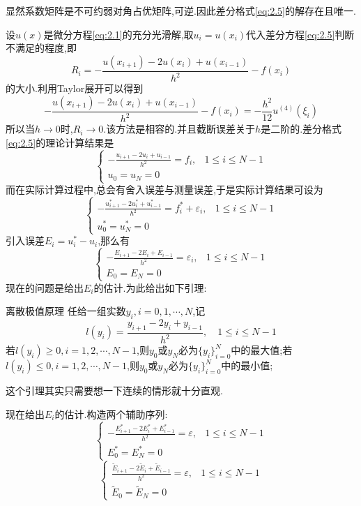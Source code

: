 显然系数矩阵是不可约弱对角占优矩阵,可逆.因此差分格式\eqref{eq:2.5}的解存在且唯一.\par
设$u(x)$是微分方程\eqref{eq:2.1}的充分光滑解,取$u_i=u(x_i)$代入差分方程\eqref{eq:2.5}判断不满足的程度,即
$$
R_i=-\frac{u(x_{i+1})-2u(x_i)+u(x_{i-1})}{h^2}-f(x_i)
$$
的大小.利用Taylor展开可以得到
$$
-\frac{u(x_{i+1})-2u(x_i)+u(x_{i-1})}{h^2}-f(x_i)=-\frac{h^2}{12}u^{(4)}(\xi_i)
$$
所以当$h\to 0$时,$R_i\to 0$.该方法是相容的.并且截断误差关于$h$是二阶的.差分格式\eqref{eq:2.5}的理论计算结果是
$$
\begin{cases}
    -\frac{u_{i+1}-2u_i+u_{i-1}}{h^2}=f_i,&1\leqslant i\leqslant N-1\\[7pt]
    u_0=u_N=0
\end{cases}
$$
而在实际计算过程中,总会有舍入误差与测量误差,于是实际计算结果可设为
$$
\begin{cases}
    -\frac{u_{i+1}^*-2u_i^*+u_{i-1}^*}{h^2}=f_i^*+\varepsilon_i,&1\leqslant i\leqslant N-1\\[7pt]
    u_0^*=u_N^*=0
\end{cases}
$$
引入误差$E_i=u_i^*-u_i$,那么有
$$
\begin{cases}
    -\frac{E_{i+1}-2E_i+E_{i-1}}{h^2}=\varepsilon_i,&1\leqslant i\leqslant N-1\\[7pt]
    E_0=E_N=0
\end{cases}
$$
现在的问题是给出$E_i$的估计.为此给出如下引理:\par
\begin{Theorem}{离散极值原理}
    任给一组实数$y_i,i=0,1,\cdots,N$,记
$$
l(y_i)=\frac{y_{i+1}-2y_i+y_{i-1}}{h^2},\quad 1\leqslant i\leqslant N-1
$$
若$l(y_i)\geqslant 0,i=1,2,\cdots,N-1$,则$y_0$或$y_N$必为$\{y_i\}_{i=0}^N$中的最大值;若$l(y_i)\leqslant 0,i=1,2,\cdots,N-1$,则$y_0$或$y_N$必为$\{y_i\}_{i=0}^N$中的最小值;\par
\end{Theorem}
这个引理其实只需要想一下连续的情形就十分直观.\par
现在给出$E_i$的估计.构造两个辅助序列:
$$
\begin{cases}
    -\frac{E_{i+1}^*-2E_i^*+E_{i-1}^*}{h^2}=\varepsilon, &1\leqslant i\leqslant N-1\\[7pt]
    E_0^*=E_N^*=0
\end{cases}
$$
$$
\begin{cases}
    \frac{\tilde{E}_{i+1}-2\tilde{E}_i+\tilde{E}_{i-1}}{h^2}=\varepsilon, &1\leqslant i\leqslant N-1\\[7pt]
    \tilde{E}_0=\tilde{E}_N=0
\end{cases}
$$
